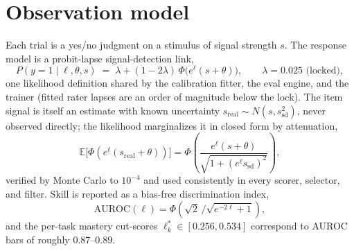 \documentclass[11pt]{article}
\newcommand{\ellstar}{\ell^{*}}
\begin{document}
\section{Observation model}
Each trial is a yes/no judgment on a stimulus of signal strength $s$. The
response model is a probit-lapse signal-detection link,
\begin{equation}
\label{eq:obs}
P(y=1 \mid \ell,\theta,s) \;=\; \lambda + (1-2\lambda)\,\Phi\!\big(e^{\ell}(s+\theta)\big),
\qquad \lambda = 0.025 \text{ (locked)},
\end{equation}
one likelihood definition shared by the calibration fitter, the eval engine, and
the trainer (fitted rater lapses are an order of magnitude below the lock).
The item signal is itself an estimate with known uncertainty
$s_{\mathrm{real}} \sim N(s, s_{\mathrm{sd}}^2)$, never observed directly; the
likelihood marginalizes it in closed form by attenuation,
\begin{equation}
\label{eq:atten}
\mathbb{E}\big[\Phi(e^{\ell}(s_{\mathrm{real}}+\theta))\big]
= \Phi\!\left(\frac{e^{\ell}(s+\theta)}{\sqrt{1+(e^{\ell} s_{\mathrm{sd}})^2}}\right),
\end{equation}
verified by Monte Carlo to $10^{-4}$ and used consistently in every scorer,
selector, and filter. Skill is reported as a bias-free discrimination index,
\begin{equation}
\mathrm{AUROC}(\ell) = \Phi\!\left(\sqrt{2}\,\big/\sqrt{e^{-2\ell}+1}\right),
\end{equation}
and the per-task mastery cut-scores $\ellstar_k \in [0.256, 0.534]$ correspond to
AUROC bars of roughly $0.87$--$0.89$.
\end{document}
